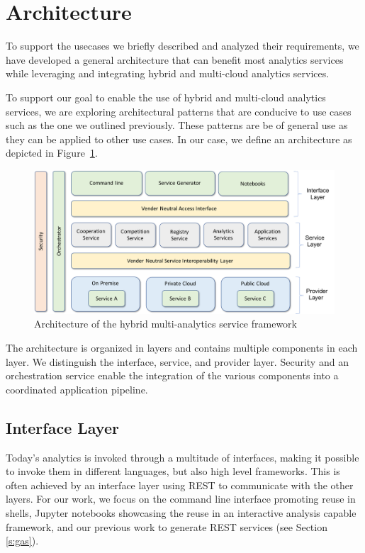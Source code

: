 
\section{Architecture}

To support the usecases we briefly described and analyzed their requirements, 
we have developed a general architecture that can benefit most analytics services while leveraging and integrating hybrid and multi-cloud  analytics services.

To support our goal to enable the use of hybrid and multi-cloud analytics
services, we are exploring architectural patterns
that are conducive to use cases such as the one we outlined
previously. These patterns are be of general use as they can
be applied to other use cases. In our case, we define an
architecture as depicted in Figure~\ref{fig:arch}.

\begin{figure}[htb]
  \begin{center}
    \includegraphics[width=1.0\columnwidth]{images/hybrid-service-arch.pdf}
    \end{center}
  \caption {Architecture of the hybrid multi-analytics service
    framework}
  \label{fig:arch}
\end{figure}

The architecture is organized in layers  and contains
multiple components in each layer. We distinguish the interface,
service, and provider layer. Security and an orchestration service
enable the integration of the various components into a coordinated
application pipeline.

\subsection{Interface Layer}

Today's analytics is invoked through a multitude of interfaces, making
it possible to invoke them in different languages, but also high level
frameworks. This is often achieved by an interface layer using REST
to communicate with the other layers. For our work, we focus on
the command line interface promoting reuse in shells, Jupyter notebooks
showcasing the reuse in an interactive analysis capable framework, and
our previous work to generate REST services (see Section \ref{s:gas}).

